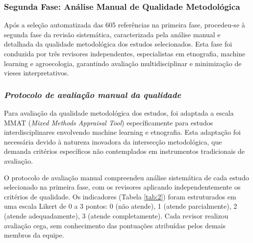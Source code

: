 \subsubsection{Segunda Fase: Análise Manual de Qualidade Metodológica}

Após a seleção automatizada das 605 referências na primeira fase, procedeu-se à segunda fase da revisão sistemática, caracterizada pela análise manual e detalhada da qualidade metodológica dos estudos selecionados. Esta fase foi conduzida por três revisores independentes, especialistas em etnografia, machine learning e agroecologia, garantindo avaliação multidisciplinar e minimização de vieses interpretativos.

\subsubsection{\textit{Protocolo de avaliação manual da qualidade}}

Para avaliação da qualidade metodológica dos estudos, foi adaptada a escala MMAT (\textit{Mixed Methods Appraisal Tool}) \cite{ISI:000604326800014} específicamente para estudos interdisciplinares envolvendo machine learning e etnografia. Esta adaptação foi necessária devido à natureza inovadora da intersecção metodológica, que demanda critérios específicos não contemplados em instrumentos tradicionais de avaliação.

O protocolo de avaliação manual compreendeu análise sistemática de cada estudo selecionado na primeira fase, com os revisores aplicando independentemente os critérios de qualidade. Os indicadores (Tabela \ref{tab:2}) foram estruturados em uma escala Likert de 0 a 3 pontos: 0 (não atende), 1 (atende parcialmente), 2 (atende adequadamente), 3 (atende completamente). Cada revisor realizou avaliação cega, sem conhecimento das pontuações atribuídas pelos demais membros da equipe.

